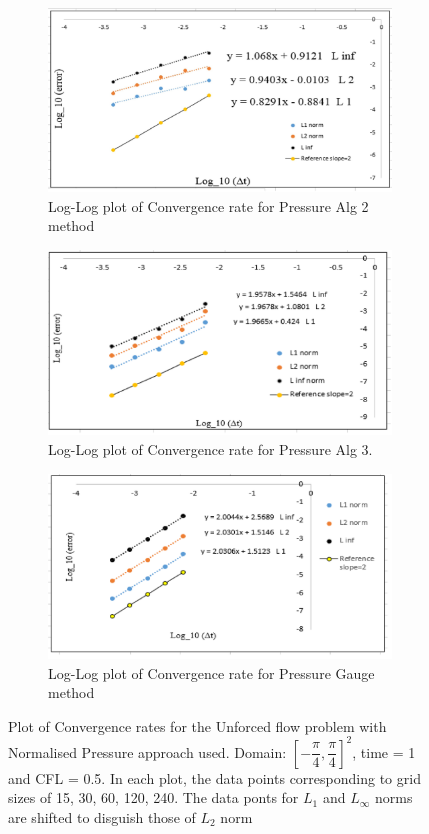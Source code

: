 \begin{figure}[H]
	\centering
	\begin{subfigure}[t]{4.5in}
		\centering
		\includegraphics[width=4.5in]{figures/Pm1b_unf1_np_P_rate.jpg}
		\caption{Log-Log plot of Convergence rate for Pressure Alg 2 method}\label{fig:6.14a}		
	\end{subfigure}
	\quad
	\begin{subfigure}[t]{4.5in}
		\centering
		\includegraphics[width=4.5in]{figures/Pm2_unf1_np_P_rate.jpg}
		\caption{Log-Log plot of Convergence rate for Pressure Alg 3. }\label{fig:6.14b}
	\end{subfigure}
	\quad
	\begin{subfigure}[t]{4.5in}
		\centering
		\includegraphics[width=4.5in]{figures/Gauge_unf1_np_P_rate.jpg}
		\caption{Log-Log plot of Convergence rate for Pressure Gauge method }\label{fig:6.14c}
	\end{subfigure}
	\caption{Plot of Convergence rates for the Unforced flow problem with Normalised Pressure approach used. Domain: $[-\dfrac{\pi}{4}, \dfrac{\pi}{4}]^2$, time = 1 and CFL = 0.5. In each plot, the data points corresponding to grid sizes of 15, 30, 60, 120, 240. The data ponts for $L_1$ and $L_\infty$ norms are shifted to disguish those of $L_2$ norm}\label{fig:6.14}
\end{figure}

